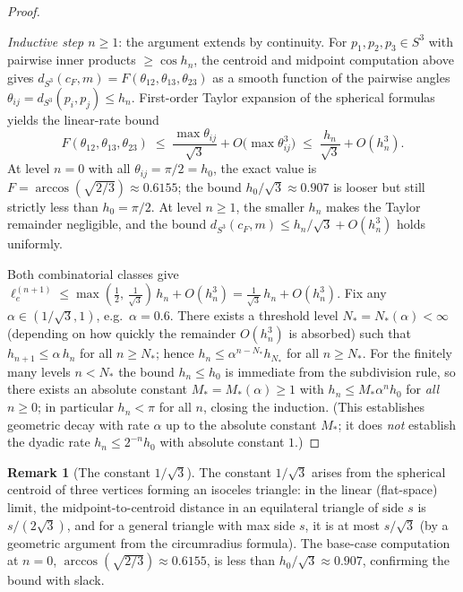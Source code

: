 \documentclass[11pt, a4paper]{amsart}
\theoremstyle{definition}
\newtheorem{remark}[theorem]{Remark}
\newcommand{\dsph}{d_{S^3}}
\begin{document}
\begin{proof}
\begin{enumerate}
  \emph{Inductive step $n \geq 1$}: the argument extends by
  continuity. For $p_1, p_2, p_3 \in S^3$ with pairwise inner
  products $\geq \cos h_n$, the centroid and midpoint computation
  above gives $\dsph(c_F, m) = F(\theta_{12}, \theta_{13},
  \theta_{23})$ as a smooth function of the pairwise angles
  $\theta_{ij} = \dsph(p_i, p_j) \leq h_n$. First-order Taylor
  expansion of the spherical formulas yields the linear-rate
  bound
  \[
    F(\theta_{12}, \theta_{13}, \theta_{23})
      \;\leq\; \frac{\max\theta_{ij}}{\sqrt{3}}
        + O\bigl(\max\theta_{ij}^3\bigr)
      \;\leq\; \frac{h_n}{\sqrt{3}} + O(h_n^3).
  \]
  At level $n = 0$ with all $\theta_{ij} = \pi/2 = h_0$, the
  exact value is $F = \arccos(\sqrt{2/3}) \approx 0.6155$; the
  bound $h_0/\sqrt{3} \approx 0.907$ is looser but still strictly
  less than $h_0 = \pi/2$. At level $n \geq 1$, the smaller
  $h_n$ makes the Taylor remainder negligible, and the bound
  $\dsph(c_F, m) \leq h_n/\sqrt{3} + O(h_n^3)$ holds uniformly.
\end{enumerate}
Both combinatorial classes give
$\ell_e^{(n+1)} \leq \max(\tfrac{1}{2},\,
\tfrac{1}{\sqrt{3}})\,h_n + O(h_n^3) = \tfrac{1}{\sqrt{3}}\,h_n
+ O(h_n^3)$. Fix any $\alpha \in (1/\sqrt{3}, 1)$, e.g.\
$\alpha = 0.6$. There exists a threshold level $N_\ast =
N_\ast(\alpha) < \infty$ (depending on how quickly the remainder
$O(h_n^3)$ is absorbed) such that $h_{n+1} \leq \alpha\,h_n$ for
all $n \geq N_\ast$; hence $h_n \leq \alpha^{n - N_\ast} h_{N_\ast}$
for all $n \geq N_\ast$. For the finitely many levels $n < N_\ast$
the bound $h_n \leq h_0$ is immediate from the subdivision rule,
so there exists an absolute constant $M_\ast = M_\ast(\alpha) \geq
1$ with $h_n \leq M_\ast \alpha^n h_0$ for \emph{all} $n \geq 0$;
in particular $h_n < \pi$ for all $n$, closing the induction.
(This establishes geometric decay with rate $\alpha$ up to the
absolute constant $M_\ast$; it does \emph{not} establish the
dyadic rate $h_n \leq 2^{-n} h_0$ with absolute constant $1$.)
\end{proof}

\begin{remark}[The constant $1/\sqrt{3}$]
\label{rmk:mid-cent-strict}
The constant $1/\sqrt{3}$ arises from the spherical centroid of
three vertices forming an isoceles triangle: in the linear
(flat-space) limit, the midpoint-to-centroid distance in an
equilateral triangle of side $s$ is $s/(2\sqrt{3})$, and for a
general triangle with max side $s$, it is at most $s/\sqrt{3}$
(by a geometric argument from the circumradius formula). The
base-case computation at $n = 0$, $\arccos(\sqrt{2/3}) \approx
0.6155$, is less than $h_0/\sqrt{3} \approx 0.907$, confirming
the bound with slack.
\end{remark}
\end{document}
